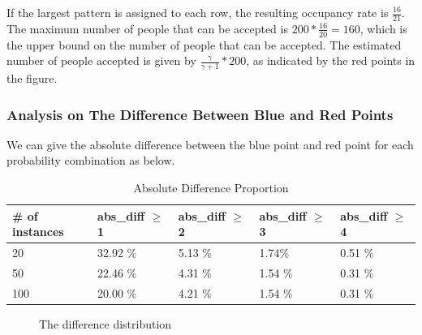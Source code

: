 If the largest pattern is assigned to each row, the resulting occupancy rate is $\frac{16}{21}$. The maximum number of people that can be accepted is $200 * \frac{16}{20} = 160$, which is the upper bound on the number of people that can be accepted. The estimated number of people accepted is given by $\frac{\gamma}{\gamma+1} * 200$, as indicated by the red points in the figure.

\subsubsection{Analysis on The Difference Between Blue and Red Points}
We can give the absolute difference between the blue point and red point for each probability combination as below.

\begin{table}[ht]
  \centering
  \caption{Absolute Difference Proportion}\label{tab_diff}
  \begin{tabular}{|l|l|l|l|l|}
  \hline
  \# of instances & abs\_diff $\geq$ 1 & abs\_diff $\geq$ 2 & abs\_diff $\geq$ 3 & abs\_diff $\geq$ 4 \\
  \hline
  20 & 32.92 \% & 5.13 \% & 1.74\% & 0.51 \% \\
  50 & 22.46 \% & 4.31 \% & 1.54 \% & 0.31 \%  \\
  100 & 20.00 \% & 4.21 \% & 1.54 \% & 0.31 \% \\
  \hline
  \end{tabular}
\end{table}

\begin{figure}[ht]
  \centering
  \caption{The difference distribution}
  \label{fig_diff}
\end{figure}

